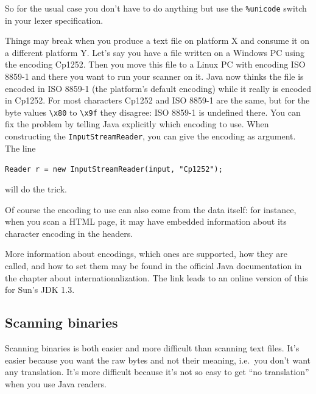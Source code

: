 \documentclass[11pt]{scrartcl}
\begin{document}
So for the usual case you don't have to do anything but use the
\texttt{\%unicode} switch in your lexer specification.

Things may break when you produce a text file on platform X and
consume it on a different platform Y. Let's say you have a file
written on a Windows PC using the encoding Cp1252. Then you move
this file to a Linux PC with encoding ISO 8859-1 and there you want
to run your scanner on it. Java now thinks the file is encoded
in ISO 8859-1 (the platform's default encoding) while it really is 
encoded in Cp1252. For most characters
Cp1252 and ISO 8859-1 are the same, but for the byte values \verb+\x80+
to \verb+\x9f+ they disagree: ISO 8859-1 is undefined there. You can fix
the problem by telling Java explicitly which encoding to use. When
constructing the \texttt{InputStreamReader}, you can give the encoding
as argument. The line
\begin{center}
\texttt{Reader r = new InputStreamReader(input, "Cp1252"); }
\end{center}
will do the trick.

Of course the encoding to use can also come from the data itself:
for instance, when you scan a HTML page, it may have embedded 
information about its character encoding in the headers.

More information about encodings, which ones are supported, how
they are called, and how to set them may be found in the
official Java documentation in the chapter about 
internationalization. 
The link 
leads to an online version of this for Sun's JDK 1.3.

\subsection{Scanning binaries\label{sec:howtobinary}}

Scanning binaries is both easier and more difficult
than scanning text files. It's easier because you want
the raw bytes and not their meaning, i.e.~you don't want 
any translation.
It's more difficult because it's not so easy to get
``no translation'' when you use Java readers. 
\end{document}
